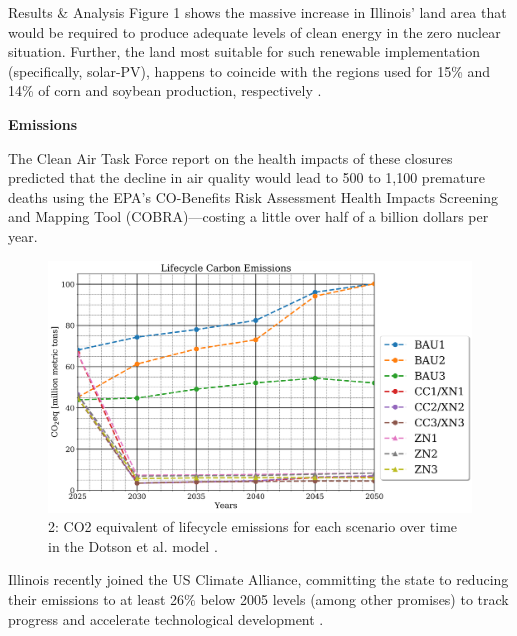 \documentclass[final]{beamer}
\newlength{\onecolwid}
\newlength{\threecolwid}
\begin{document}
\begin{frame}[t]
\begin{columns}[t,totalwidth=\threecolwid]
\begin{column}{\onecolwid}
\begin{block}{Results \& Analysis}
Figure 1 shows the massive increase in Illinois' land area that would be required to produce adequate levels of clean energy in the zero nuclear situation. Further, the land most suitable for such renewable implementation (specifically, solar-PV), happens to coincide with the regions used for 15\% and 14\% of corn and soybean production, respectively \cite{schleusener}.

\vspace{0.7em}
\textbf{Emissions}
\vspace{0.7em}

The Clean Air Task Force report \cite{health} on the health impacts of these closures predicted that the decline in air quality would lead to 500 to 1,100 premature deaths using the EPA’s CO-Benefits Risk Assessment Health Impacts Screening and Mapping Tool (COBRA)---costing a little over half of a billion dollars per year.
\begin{figure}[ht]
  \centering
  \includegraphics[scale=0.7]{co2eq_all_comparison.png}
  \caption{2: CO2 equivalent of lifecycle emissions for each scenario over time in the Dotson et al. model \cite{dotson}.}
  \label{fig:co2eq_time}
\end{figure}

Illinois recently joined the US Climate Alliance, committing the state to reducing their emissions to at least 26$\%$ below 2005 levels (among other promises) to track progress and accelerate technological development \cite{climate}.

\end{block}



\end{column} %


\end{columns}
\end{frame}
\end{document}
